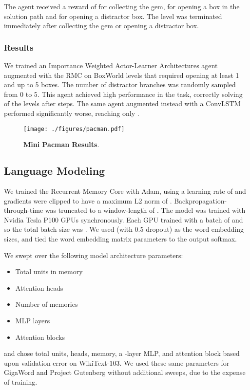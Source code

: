 \documentclass{article}
\begin{document}
The agent received a reward of  for collecting the gem,  for opening a box in the solution path and  for opening a distractor box. The level was terminated immediately after collecting the gem or opening a distractor box.

\subsubsection{Results}
We trained an Importance Weighted Actor-Learner Architectures agent augmented with the RMC on BoxWorld levels that required opening at least 1 and up to 5 boxes. The number of distractor branches was randomly sampled from 0 to 5. This agent achieved high performance in the task, correctly solving  of the levels after  steps. The same agent augmented instead with a ConvLSTM performed significantly worse, reaching only . 

\begin{figure}
    \centering
    \texttt{[image: ./figures/pacman.pdf]}
    \caption{\textbf{Mini Pacman Results}.}
    \label{fig:pacman}
\end{figure}

\subsection{Language Modeling}
\label{app:lm}

We trained the Recurrent Memory Core with Adam, using a learning rate of  and gradients were clipped to have a maximum L2 norm of . Backpropagation-through-time was truncated to a window-length of . The model was trained with  Nvidia Tesla P100 GPUs synchronously. Each GPU trained with a batch of  and so the total batch size was . We used  (with 0.5 dropout) as the word embedding sizes, and tied the word embedding matrix parameters to the output softmax.

We swept over the following model architecture parameters:

\begin{itemize}
    \item Total units in memory  
    \item Attention heads  
    \item Number of memories 
    \item MLP layers 
    \item Attention blocks 
\end{itemize}

and chose  total units,  heads,  memory, a -layer MLP, and  attention block based upon validation error on WikiText-103. We used these same parameters for GigaWord and Project Gutenberg without additional sweeps, due to the expense of training.
\end{document}
